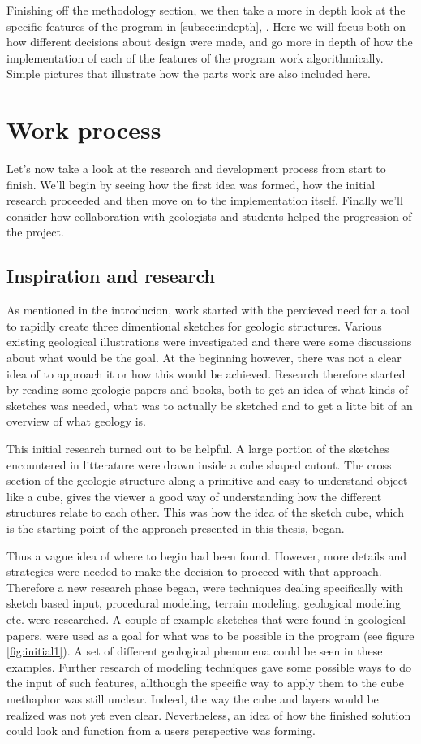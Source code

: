 \documentclass[a4paper,12pt]{report}
\newcommand{\secref}[1]{\autoref{#1}, \nameref{#1}}
\begin{document}
Finishing off the methodology section, we then take a more in depth look at the specific features of the program in \secref{subsec:indepth}. Here we will focus both on how different decisions about design were made, and go more in depth of how the implementation of each of the features of the program work algorithmically. Simple pictures that illustrate how the parts work are also included here.

\section{Work process}
Let's now take a look at the research and development process from start to finish. We'll begin by seeing how the first idea was formed, how the initial research proceeded and then move on to the implementation itself. Finally we'll consider how collaboration with geologists and students helped the progression of the project.
\label{subsec:work}
\subsection{Inspiration and research}
As mentioned in the introducion, work started with the percieved need for a tool to rapidly create three dimentional sketches for geologic structures. Various existing geological illustrations were investigated and there were some discussions about what would be the goal. At the beginning however, there was not a clear idea of to approach it or how this would be achieved. Research therefore started by reading some geologic papers and books, both to get an idea of what kinds of sketches was needed, what was to actually be sketched and to get a litte bit of an overview of what geology is.

This initial research turned out to be helpful. A large portion of the sketches encountered in litterature were drawn inside a cube shaped cutout. The cross section of the geologic structure along a primitive and easy to understand object like a cube, gives the viewer a good way of understanding how the different structures relate to each other. This was how the idea of the sketch cube, which is the starting point of the approach presented in this thesis, began.

Thus a vague idea of where to begin had been found. However, more details and strategies were needed to make the decision to proceed with that approach. Therefore a new research phase began, were techniques dealing specifically with sketch based input, procedural modeling, terrain modeling, geological modeling etc. were researched. A couple of example sketches that were found in geological papers, were used as a goal for what was to be possible in the program (see figure \ref{fig:initial1}). A set of different geological phenomena could be seen in these examples. Further research of modeling techniques gave some possible ways to do the input of such features, allthough the specific way to apply them to the cube methaphor was still unclear. Indeed, the way the cube and layers would be realized was not yet even clear. Nevertheless, an idea of how the finished solution could look and function from a users perspective was forming.
\end{document}
